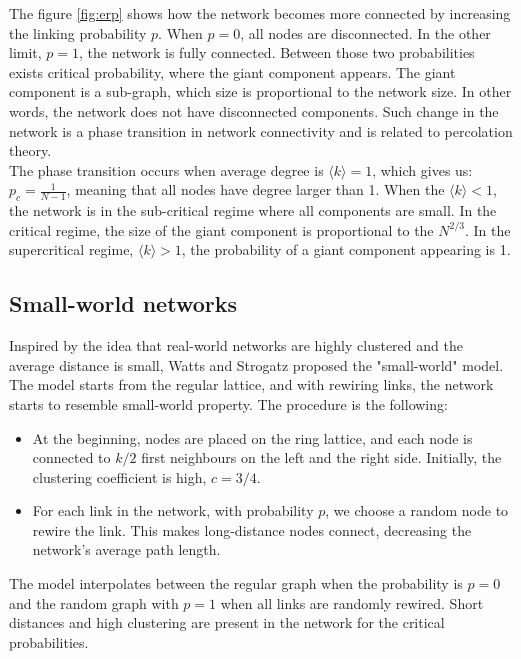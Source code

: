 The figure \ref{fig:erp} shows how the network becomes more connected by increasing the linking probability $p$. When $p=0$, all nodes are disconnected. In the other limit, $p=1$, the network is fully connected. Between those two probabilities exists critical probability, where the giant component appears. The giant component is a sub-graph, which size is proportional to the network size. In other words, the network does not have disconnected components. Such change in the network is a phase transition in network connectivity and is related to percolation theory. \\

The phase transition occurs when average degree is $ \langle k  \rangle = 1$, which gives us: $p_c = \frac{1}{N-1}$, meaning that all nodes have degree larger than 1. When the $ \langle k  \rangle < 1$, the network is in the sub-critical regime where all components are small. In the critical regime, the size of the giant component is proportional to the $N^{2/3}$. In the supercritical regime, $ \langle k  \rangle > 1$, the probability of a giant component appearing is 1.

\subsection{Small-world networks}

Inspired by the idea that real-world networks are highly clustered and the average distance is small, Watts and Strogatz proposed the "small-world" model. The model starts from the regular lattice, and with rewiring links, the network starts to resemble small-world property. The procedure is the following:

\begin{itemize}
	\item At the beginning, nodes are placed on the ring lattice, and each node is connected to $k/2$ first neighbours on the left and the right side. Initially, the clustering coefficient is high, $c=3/4$. 
	\item For each link in the network, with probability $p$, we choose a random node to rewire the link. This makes long-distance nodes connect, decreasing the network's average path length. 
\end{itemize}

The model interpolates between the regular graph when the probability is $p=0$ and the random graph with $p=1$ when all links are randomly rewired. Short distances and high clustering are present in the network for the critical probabilities.

